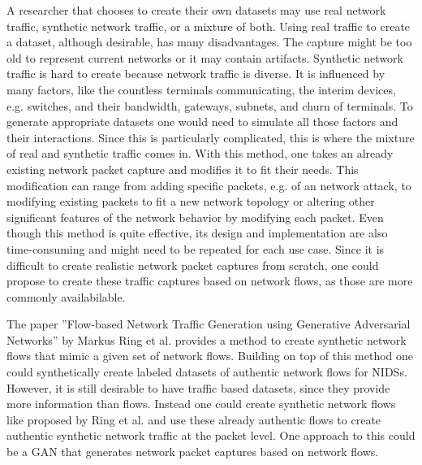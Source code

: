 \documentclass[
	ngerman,
	ruledheaders=section,%
	class=report,%
	thesis={type=bachelor},%
	accentcolor=9c,%
	custommargins=true,%
	marginpar=false,%
	parskip=half-,%
	fontsize=11pt,%
	twoside
]{tudapub}
\begin{document}
A researcher that chooses to create their own datasets may use real network traffic, synthetic network traffic, or a mixture of both.
Using real traffic to create a dataset, although desirable, has many disadvantages.
The capture might be too old to represent current networks or
it may contain artifacts.
Synthetic network traffic is hard to create because network traffic is diverse.
It is influenced by many factors, like
the countless terminals communicating,
the interim devices, e.g. switches, and their bandwidth,
gateways, subnets, and churn of terminals.
To generate appropriate datasets one would need to simulate all those factors and their interactions.
Since this is particularly complicated,
this is where the mixture of real and synthetic traffic comes in.
With this method, one takes an already existing network packet capture and modifies it to fit their needs.
This modification can range from adding specific packets, e.g. of an network attack\cite{corderoID2TDIYDataset2015},
to modifying existing packets to fit a new network topology
or altering other significant features of the network behavior by modifying each packet.
Even though this method is quite effective, its design and implementation are also time-consuming and might need to be repeated for each use case.
Since it is difficult to create realistic network packet captures from scratch,
one could propose to create these traffic captures based on network flows, as those are more commonly availabilable.

The paper ''Flow-based Network Traffic Generation using Generative Adversarial Networks'' by Markus Ring et al. \cite{ringFlowbasedNetworkTraffic2019a} provides a method to create synthetic network flows that mimic a given set of network flows.
Building on top of this method one could synthetically create labeled datasets of authentic network flows for NIDSs.
However, it is still desirable to have traffic based datasets, since they provide more information than flows.
Instead one could create synthetic network flows like proposed by Ring et al. \cite{ringFlowbasedNetworkTraffic2019a} and
use these already authentic flows to create authentic synthetic network traffic at the packet level.
One approach to this could be a GAN that generates network packet captures based on network flows.
\end{document}
